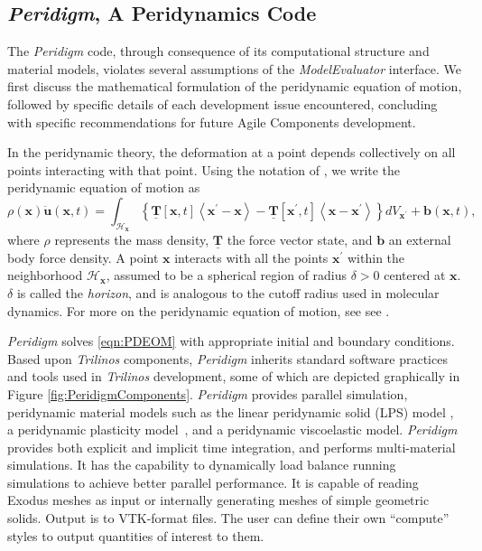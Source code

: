 \documentclass[pdf,ps2pdf,12pt,report]{SANDreport}
\theoremstyle{plain}
\theoremstyle{definition}
\theoremstyle{remark}
\numberwithin{equation}{section}
\begin{document}
\subsection{\emph{Peridigm}, A Peridynamics Code} \label{sec:peridigm}

The \emph{Peridigm} code, through consequence of its computational structure and material models, violates several assumptions of the \emph{ModelEvaluator} interface. We first discuss the mathematical formulation of the peridynamic equation of motion, followed by specific details of each development issue encountered, concluding with specific recommendations for future Agile Components development.

In the peridynamic theory, the deformation at a point depends collectively on all points interacting with that point. Using the notation of \cite{Silling:2007:PDStates}, we write the peridynamic equation of motion as
\begin{equation} \label{eqn:PDEOM}
\rho(\mathbf{x}) \ddot{\mathbf{u}}(\mathbf{x},t) = \int_{\mathcal{H}_{\mathbf{x}}}
\left\{ \underline{\mathbf{T}}\left[ \mathbf{x},t \right]\left<\mathbf{x}^{\prime}-\mathbf{x} \right>
 - \underline{\mathbf{T}}\left[\mathbf{x}^{\prime},t \right]\left<\mathbf{x}-\mathbf{x}^{\prime} \right> \right\}
{d}V_{\mathbf{x}^\prime} + \mathbf{b}(\mathbf{x},t),
\end{equation}
where $\rho$ represents the mass density, $\underline{\mathbf{T}}$ the force vector state, and $\mathbf{b}$ an external body force density. A point $\mathbf{x}$ interacts with all the points $\mathbf{x}^{\prime}$ within the neighborhood $\mathcal{H}_{\mathbf{x}}$, assumed to be a spherical region of radius $\delta>0$ centered at $\mathbf{x}$. $\delta$ is called the {\em horizon}, and is analogous to the cutoff radius used in molecular dynamics. For more on the peridynamic equation of motion, see see \cite{Silling:2007:PDStates}.

\emph{Peridigm} solves \eqref{eqn:PDEOM} with appropriate initial and boundary conditions. Based upon \emph{Trilinos} components, \emph{Peridigm} inherits standard software practices and tools used in \emph{Trilinos} development, some of which are depicted graphically in Figure \ref{fig:PeridigmComponents}. \emph{Peridigm} provides parallel simulation, peridynamic material models such as the linear peridynamic solid (LPS) model \cite{Silling:2007:PDStates}, a peridynamic plasticity model~\cite{Mitchell:2011:Plasticity}, and a peridynamic viscoelastic model. \emph{Peridigm} provides both explicit and implicit time integration, and performs multi-material simulations. It has the capability to dynamically load balance running simulations to achieve better parallel performance. It is capable of reading Exodus meshes as input or internally generating meshes of simple geometric solids. Output is to VTK-format files. The user can define their own ``compute'' styles to output quantities of interest to them.
\end{document}
